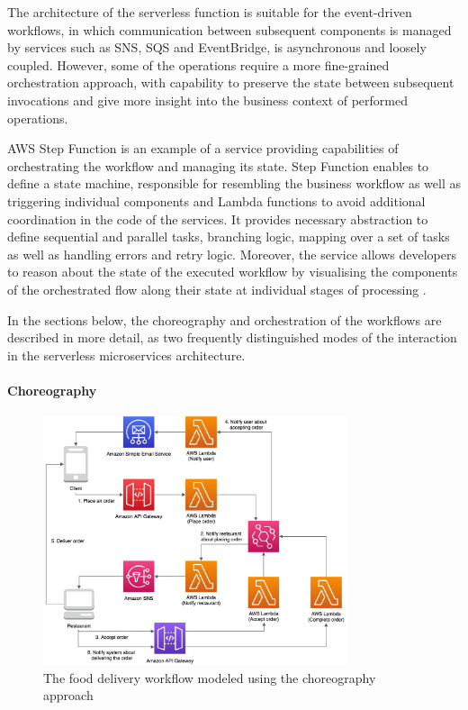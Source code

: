 The architecture of the serverless function is suitable for the event-driven workflows, in which communication between subsequent components is managed by services such as SNS, SQS and EventBridge, is asynchronous and loosely coupled.
However, some of the operations require a more fine-grained orchestration approach, with capability to preserve the state between subsequent invocations and give more insight into the business context of performed operations.

AWS Step Function is an example of a service providing capabilities of orchestrating the workflow and managing its state.
Step Function enables to define a state machine, responsible for resembling the business workflow as well as triggering individual components and Lambda functions to avoid additional coordination in the code of the services.
It provides necessary abstraction to define sequential and parallel tasks, branching logic, mapping over a set of tasks as well as handling errors and retry logic.
Moreover, the service allows developers to reason about the state of the executed workflow by visualising the components of the orchestrated flow along their state at individual stages of processing \cite{ImplementingMicroservicesOnAWS}.

In the sections below, the choreography and orchestration of the workflows are described in more detail, as two frequently distinguished modes of the interaction in the serverless microservices architecture.

\paragraph{Choreography}

\begin{figure}[]
   \centering
   \includegraphics[width=0.8\textwidth]{assets/04-serverless-for-web-apps/choreography.png}
   \caption{The food delivery workflow modeled using the choreography approach}
   \label{fig:choreography-diagram}
\end{figure}

